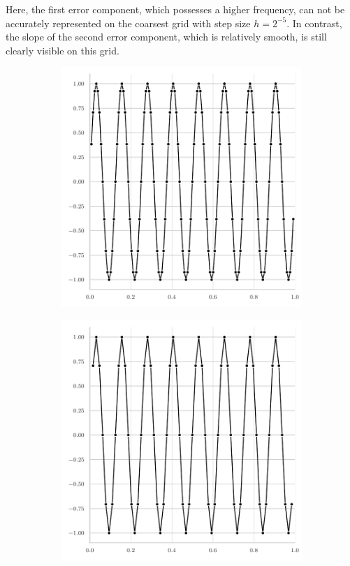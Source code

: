 Here, the first error component, which possesses a higher frequency, can not be accurately represented on the coarsest grid with step size $h = 2^{-5}$.
In contrast, the slope of the second error component, which is relatively smooth, is still clearly visible on this grid. 
\begin{figure}[t]
	\begin{subfigure}[b]{0.32\textwidth}
		\centering
		\includegraphics[width=\textwidth]{figures/error_plots//initial_error_16pi_level7.pdf}
	\end{subfigure}
	\hfill
	\begin{subfigure}[b]{0.32\textwidth}
		\centering
		\includegraphics[width=\textwidth]{figures/error_plots//initial_error_16pi_level6.pdf}

\end{subfigure}
\end{figure}
